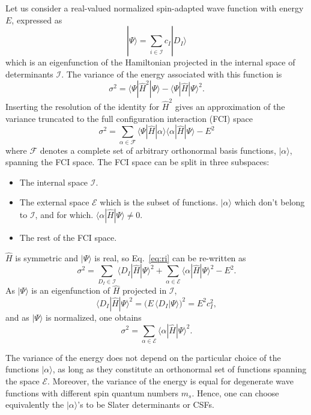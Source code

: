 \documentclass[aip,jcp,reprint,showkeys]{revtex4-1}
\newcommand{\ket}[1]{|#1\rangle}
\newcommand{\csf}{CSF}
\newcommand{\mel}[3]{\langle #1 | #2 | #3 \rangle}
\begin{document}
Let us consider a real-valued normalized spin-adapted wave function with
energy $E$, expressed as
\begin{equation}
\ket{\Psi} = \sum_{i \in \mathcal{I}} c_I \ket{D_I}
\end{equation}
which is an eigenfunction of the Hamiltonian projected in the internal space of
determinants $\mathcal{I}$.
The variance of the energy associated with this function is
\begin{equation}
\sigma^2 = \mel{\Psi}{\hat{H}^2}{\Psi} - \mel{\Psi}{\hat{H}}{\Psi}^2 .
\end{equation}
Inserting the resolution of the identity for $\hat{H}^2$ gives an
approximation of the variance truncated to the full configuration interaction (FCI) space
\begin{equation}
\sigma^2 = \sum_{\alpha \in \mathcal{F}} \mel{\Psi}{\hat{H}}{\alpha} \mel{\alpha}{\hat{H}}{\Psi} - E^2
\label{eq:ri}
\end{equation}
where $\mathcal{F}$ denotes a complete set of arbitrary orthonormal basis
functions, $\ket{\alpha}$, spanning the FCI space.
The FCI space can be split in three subspaces:
\begin{itemize}
\item The internal space $\mathcal{I}$.
\item The external space $\mathcal{E}$ which is the subset of functions.
      $\ket{\alpha}$ which don't belong to $\mathcal{I}$, and for which.
      $\mel{\alpha}{\hat{H}}{\Psi} \ne 0$.
\item The rest of the FCI space.
\end{itemize}
$\hat{H}$ is symmetric and $\ket{\Psi}$ is real, so Eq.~\eqref{eq:ri} can be
re-written as
\begin{equation}
\sigma^2 = \sum_{D_I    \in \mathcal{I}} \mel{D_I}{\hat{H}}{\Psi}^2 
         + \sum_{\alpha \in \mathcal{E}} \mel{\alpha}{\hat{H}}{\Psi}^2 - E^2.
\end{equation}
As $\ket{\Psi}$ is an eigenfunction of $\hat{H}$ projected in $\mathcal{I}$, 
\begin{equation}
\mel{D_I}{\hat{H}}{\Psi}^2 = \big( E\, \langle D_I | \Psi \rangle \big)^2 = E^2 c_I^2,
\end{equation}
and as $\ket{\Psi}$ is normalized, one obtains
\begin{equation}
\sigma^2 = \sum_{\alpha \in \mathcal{E}} \mel{\alpha}{\hat{H}}{\Psi}^2.
\end{equation} 

The variance of the energy does not depend on the particular choice of the
functions $\ket{\alpha}$, as long as they constitute an orthonormal set of
functions spanning the space $\mathcal{E}$. Moreover, the variance of the
energy is equal for degenerate wave functions with different spin quantum
numbers $m_s$.  Hence, one can choose equivalently the $\ket{\alpha}$'s to be
Slater determinants or {\csf s}.
\end{document}
